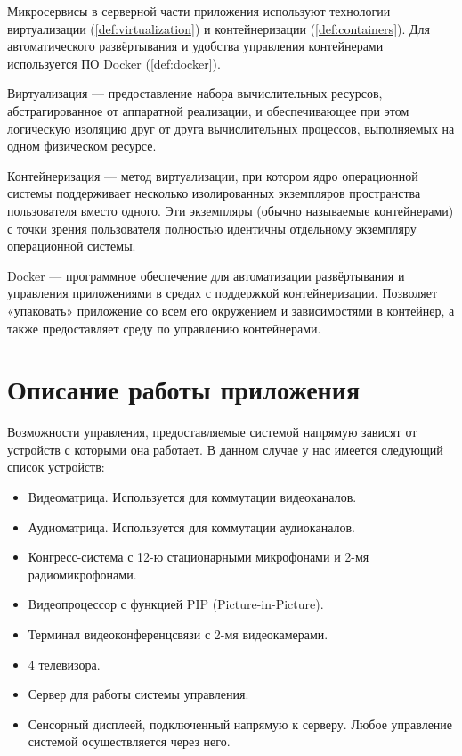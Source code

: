 \noindent Микросервисы в серверной части приложения используют технологии виртуализации (\ref{def:virtualization}) и
контейнеризации (\ref{def:containers}). Для автоматического развёртывания и удобства управления контейнерами используется
ПО Docker (\ref{def:docker}).

\begin{definition}
    \label{def:virtualization}
    Виртуализация — предоставление набора вычислительных ресурсов, абстрагированное от аппаратной реализации,
    и обеспечивающее при этом логическую изоляцию друг от друга вычислительных процессов, выполняемых на одном
    физическом ресурсе. 
\end{definition}

\begin{definition}
    \label{def:containers}
    Контейнеризация — метод виртуализации, при котором ядро операционной системы поддерживает несколько изолированных
    экземпляров пространства пользователя вместо одного. Эти экземпляры (обычно называемые контейнерами) с точки зрения
    пользователя полностью идентичны отдельному экземпляру операционной системы.
\end{definition}

\begin{definition}
    \label{def:docker}
    Docker — программное обеспечение для автоматизации развёртывания и управления приложениями в средах с
    поддержкой контейнеризации. Позволяет «упаковать» приложение со всем его окружением и зависимостями в контейнер,
    а также предоставляет среду по управлению контейнерами.
\end{definition}

\clearpage

\section{Описание работы приложения}

Возможности управления, предоставляемые системой напрямую зависят от устройств с которыми она работает. В данном случае
у нас имеется следующий список устройств:

\begin{itemize}
    \item Видеоматрица. Используется для коммутации видеоканалов.
    \item Аудиоматрица. Используется для коммутации аудиоканалов.
    \item Конгресс-система с 12-ю стационарными микрофонами и 2-мя радиомикрофонами.
    \item Видеопроцессор с функцией PIP (Picture-in-Picture).
    \item Терминал видеоконференцсвязи с 2-мя видеокамерами.
    \item 4 телевизора.
    \item Сервер для работы системы управления.
    \item Сенсорный дисплеей, подключенный напрямую к серверу. Любое управление системой осуществляется через него.
\end{itemize}

